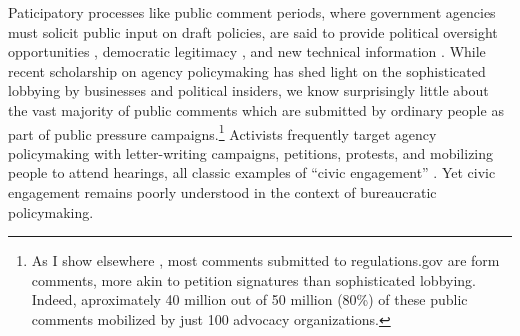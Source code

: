 
Paticipatory processes like public comment periods, where government agencies must solicit public input on draft policies, are said to provide political oversight opportunities \citep{Balla1998, Mccubbins1984}, democratic legitimacy \citep{Croley2003, Rosenbloom2003}, and new technical information \citep{Yackee2006JPART, Nelson2012}. %
While recent scholarship on agency policymaking has shed light on the sophisticated lobbying by businesses and political insiders, we know surprisingly little about the vast majority of public comments which are submitted by ordinary people as part of public pressure campaigns.\footnote{As I show elsewhere \citep{Judge-Lord2019}, most comments submitted to regulations.gov are form comments, more akin to petition signatures than sophisticated lobbying. Indeed, aproximately 40 million out of 50 million (80\%) of these public comments mobilized by just 100 advocacy organizations.}
Activists frequently target agency policymaking with letter-writing campaigns, petitions, protests, and mobilizing people to attend hearings, all classic examples of ``civic engagement'' \citep{Verba1987}. Yet civic engagement remains poorly understood in the context of bureaucratic policymaking.

